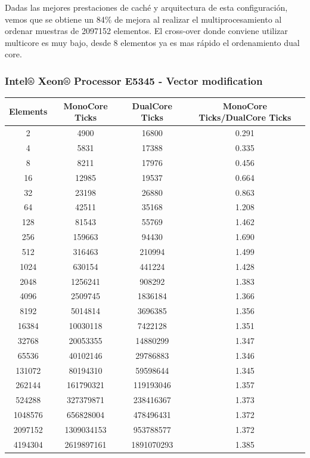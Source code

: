 	Dadas las mejores prestaciones de caché y arquitectura de esta configuración, vemos que se obtiene un 84\% de mejora al realizar el multiprocesamiento al ordenar muestras de 2097152 elementos. El cross-over donde conviene utilizar multicore es muy bajo, desde 8 elementos ya es mas rápido el ordenamiento dual core. 

\subsubsection{Intel® Xeon® Processor E5345 - Vector modification}
\begin{center}
\begin{tabular}{|c|c|c|c|}
	\hline
		Elements & MonoCore Ticks & DualCore Ticks & MonoCore Ticks/DualCore Ticks\\
	\hline
		2 & 4900 & 16800 & 0.291\\
	\hline
		4 & 5831 & 17388 & 0.335\\
	\hline
		8 & 8211 & 17976 & 0.456\\
	\hline
		16 & 12985 & 19537 & 0.664\\
	\hline
		32 & 23198 & 26880 & 0.863\\
	\hline
		64 & 42511 & 35168 & 1.208\\
	\hline
		128 & 81543 & 55769 & 1.462\\
	\hline
		256 & 159663 & 94430 & 1.690\\
	\hline
		512 & 316463 & 210994 & 1.499\\
	\hline
		1024 & 630154 & 441224 & 1.428\\
	\hline
		2048 & 1256241 & 908292 & 1.383\\
	\hline
		4096 & 2509745 & 1836184 & 1.366\\
	\hline
		8192 & 5014814 & 3696385 & 1.356\\
	\hline
		16384 & 10030118 & 7422128 & 1.351\\
	\hline
		32768 & 20053355 & 14880299 & 1.347\\
	\hline
		65536 & 40102146 & 29786883 & 1.346\\
	\hline
		131072 & 80194310 & 59598644 & 1.345\\
	\hline
		262144 & 161790321 & 119193046 & 1.357\\
	\hline
		524288 & 327379871 & 238416367 & 1.373\\
	\hline
		1048576 & 656828004 & 478496431 & 1.372\\
	\hline
		2097152 & 1309034153 & 953788577 & 1.372\\
	\hline
		4194304 & 2619897161 & 1891070293 & 1.385\\
	\hline
\end{tabular}
\end{center}

